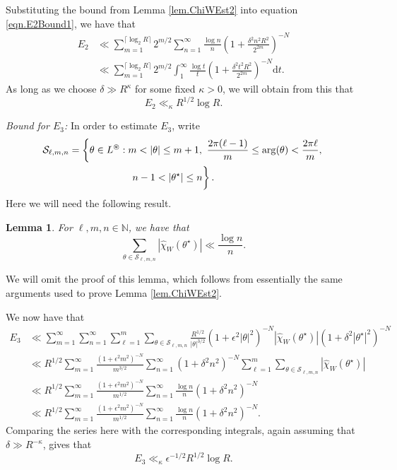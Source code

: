 \documentclass[reqno]{amsart}
\newcommand{\N}{\mathbb{N}}
\newcommand{\mc}{\mathcal}
\newcommand{\mr}{\mathrm}
\newtheorem{lemma}[theorem]{Lemma}
\begin{document}
Substituting the bound from Lemma \ref{lem.ChiWEst2} into equation \eqref{eqn.E2Bound1}, we have that
\begin{align}
	E_2&\ll \sum_{m=1}^{\lceil\log_2R\rceil}2^{m/2}\sum_{n=1}^\infty\frac{\log n}{n}\left(1+\frac{\delta^2n^2R^2}{2^{2m}}\right)^{-N}\nonumber\\
	&\ll \sum_{m=1}^{\lceil\log_2R\rceil}2^{m/2}\int_1^\infty\frac{\log t}{t}\left(1+\frac{\delta^2t^2R^2}{2^{2m}}\right)^{-N}\mr{d}t\nonumber.
\end{align}
As long as we choose $\delta\gg R^{\kappa}$ for some fixed $\kappa>0$, we will obtain from this that
\begin{equation}\label{eqn.E2Bound2}
	E_2\ll_\kappa R^{1/2}\log R.
\end{equation}

\noindent\emph{Bound for $E_3$:} In order to estimate $E_3$, write
\begin{align*}
\mc{S}_{\ell,m,n}&=\left\{\theta\in L^\circledast : m<|\theta|\le m+1,~\frac{2\pi(\ell-1)}{m}\le\mr{arg}(\theta) <\frac{2\pi\ell}{m},\right.\\
&\hspace*{50bp} \left.\phantom{\frac{2}{m}}n-1<|\theta^\star|\le n\right\}.
\end{align*}
Here we will need the following result.
\begin{lemma}\label{lem.ChiWEst3}
	For $\ell,m,n\in\N$, we have that
	\[\sum_{\theta\in\mc{S}_{\ell,m,n}}|\widehat{\chi}_W(\theta^\star)|\ll\frac{\log n}{n}.\]
\end{lemma}
We will omit the proof of this lemma, which follows from essentially the same arguments used to prove Lemma \ref{lem.ChiWEst2}.

We now have that
\begin{align*}
	E_3&\ll\sum_{m=1}^{\infty}\sum_{n=1}^\infty\sum_{\ell=1}^m\sum_{\theta\in\mc{S}_{\ell,m,n}}\frac{R^{1/2}}{|\theta|^{3/2}}\left(1+\epsilon^2|\theta|^2\right)^{-N}|\widehat{\chi}_W(\theta^\star)|\left(1+\delta^2|\theta^\star|^2\right)^{-N}\nonumber\\
	&\ll R^{1/2}\sum_{m=1}^{\infty}\frac{\left(1+\epsilon^2m^2\right)^{-N}}{m^{3/2}}\sum_{n=1}^\infty\left(1+\delta^2n^2\right)^{-N}\sum_{\ell=1}^m\sum_{\theta\in\mc{S}_{\ell,m,n}}|\widehat{\chi}_W(\theta^\star)|\\
	&\ll R^{1/2}\sum_{m=1}^{\infty}\frac{\left(1+\epsilon^2m^2\right)^{-N}}{m^{1/2}}\sum_{n=1}^\infty\frac{\log n}{n}\left(1+\delta^2n^2\right)^{-N}\\
	&\ll R^{1/2}\sum_{m=1}^{\infty}\frac{\left(1+\epsilon^2m^2\right)^{-N}}{m^{1/2}}\sum_{n=1}^\infty\frac{\log n}{n}\left(1+\delta^2n^2\right)^{-N}.
\end{align*}
Comparing the series here with the corresponding integrals, again assuming that $\delta\gg R^{-\kappa}$, gives that
\begin{equation}\label{eqn.E3Bound1}
	E_3\ll_\kappa \epsilon^{-1/2}R^{1/2}\log R.
\end{equation}
\end{document}
